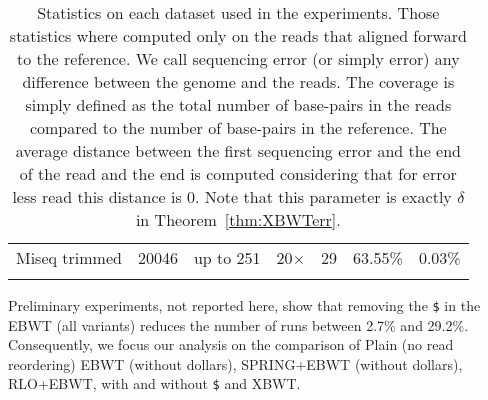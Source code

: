 \begin{table}[t]
{\begin{tabular}{ccccLLc}
Miseq trimmed                                                      & 20046           & up to 251         & 20$\times$    & 29                 & 63.55\%              & 0.03\%    \\ \hspace{0.5cm}
\end{tabular}%
}
\caption{Statistics on each dataset used in the experiments. Those statistics where computed only on the reads that aligned forward to the reference. We call sequencing error (or simply error) any difference between the genome and the reads. The coverage is simply defined as the total number of base-pairs in the reads compared to the number of base-pairs in the reference. The average distance between the first sequencing error and the end of the read and the end is computed considering that for error less read this distance is 0. Note that this parameter is exactly $\delta$ in Theorem~\ref{thm:XBWTerr}.}
\label{tab:stats_datasets}
\end{table}

Preliminary experiments, not reported here, show that removing the \texttt{\$} in the EBWT (all variants) reduces the number of runs between 2.7\% and 29.2\%. Consequently, we focus our analysis on the comparison of Plain (no read reordering) EBWT (without dollars), SPRING+EBWT (without dollars),  RLO+EBWT, with and without \texttt{\$} and XBWT.




